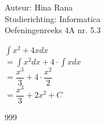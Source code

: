 \documentclass[a4paper]{article}
\newcommand{\dint}{\displaystyle\int}
\begin{document}
\noindent \large Auteur: Hina Rana \\
\noindent \large Studierichting: Informatica\\
\noindent \large Oefeningenreeks 4A nr. 5.3\\

\medskip

\normalsize

$ \dint x^2+4x dx $\\

$ =\dint x^2 dx + 4 \cdot \dint x dx $ \\

$ = \dfrac{x^3}{3} + 4 \cdot \dfrac{x^2}{2}$\\

$ = \dfrac{x^3}{3} + 2x^2 + C $


\begin{thebibliography}{999}
\end{thebibliography}
\end{document}
